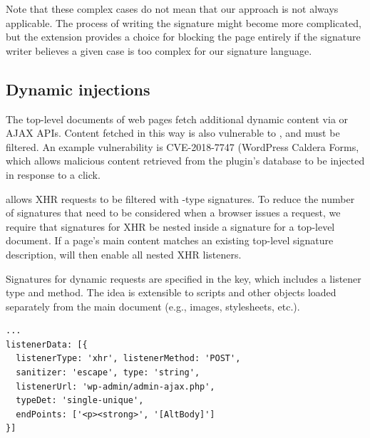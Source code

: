 Note that these complex cases do not mean that our approach is not always applicable. The process of writing the signature might become more complicated, but the extension provides a choice for blocking the page entirely if the signature writer believes a given case is too complex for our signature language.

\subsection{Dynamic injections} \label{dynamic_injections}

The top-level documents of web pages fetch additional dynamic content
via  or AJAX APIs. Content fetched in
this way is also vulnerable to \xss, and must be filtered. An example
vulnerability is CVE-2018-7747 (WordPress Caldera Forms, which allows malicious
content retrieved from the plugin's database to be injected in response to a click.

\sys allows XHR requests to be filtered with -type
signatures. To reduce the number of signatures that need to be
considered when a browser issues a request, we require that signatures
for XHR be nested inside a signature for a top-level document. If a
page's main content matches an existing top-level signature description,
\sys will then enable all nested XHR listeners.

Signatures for dynamic requests are specified in the 
key, which includes a listener type and method. The idea is extensible
to scripts and other objects loaded separately from the main document
(e.g., images, stylesheets, etc.).

\begin{lstlisting}[breaklines=true,caption={
      An example dynamic request signature. This patches CVE-2018-7747.
    },label={lst:dynamic_signature}]
...
listenerData: [{
  listenerType: 'xhr', listenerMethod: 'POST',
  sanitizer: 'escape', type: 'string',
  listenerUrl: 'wp-admin/admin-ajax.php',
  typeDet: 'single-unique',
  endPoints: ['<p><strong>', '[AltBody]']
}]
\end{lstlisting}

